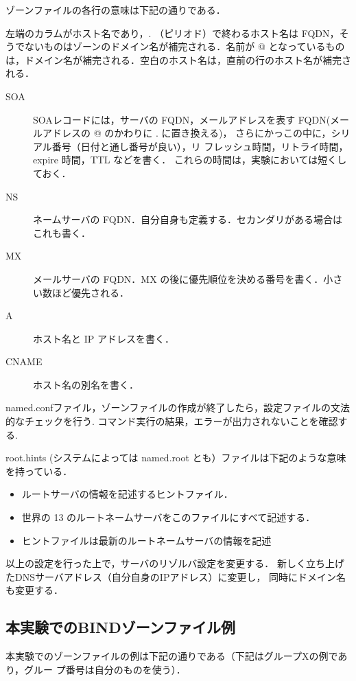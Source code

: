 ゾーンファイルの各行の意味は下記の通りである．

左端のカラムがホスト名であり，. （ピリオド）で終わるホスト名は FQDN，そ
うでないものはゾーンのドメイン名が補完される．名前が @ となっているもの
は，ドメイン名が補完される．空白のホスト名は，直前の行のホスト名が補完さ
れる．

\begin{description}
 \item[SOA] SOAレコードには，サーバの FQDN，メールアドレスを表す FQDN(メー
	    ルアドレスの @ のかわりに . に置き換える)，
	    さらにかっこの中に，シリアル番号（日付と通し番号が良い），リ
	    フレッシュ時間，リトライ時間，expire 時間，TTL などを書く．
	    これらの時間は，実験においては短くしておく．
 \item[NS] ネームサーバの FQDN．自分自身も定義する．セカンダリがある場合はこれも書く．
 \item[MX] メールサーバの FQDN．MX の後に優先順位を決める番号を書く．小さい数ほど優先される．
 \item[A] ホスト名と IP アドレスを書く．
 \item[CNAME] ホスト名の別名を書く．
\end{description}

named.confファイル，ゾーンファイルの作成が終了したら，設定ファイルの文法的なチェックを行う.
コマンド実行の結果，エラーが出力されないことを確認する.

root.hints (システムによっては named.root とも）ファイルは下記のような意味を持っている．
\begin{itemize}
\item ルートサーバの情報を記述するヒントファイル．
\item 世界の 13 のルートネームサーバをこのファイルにすべて記述する．
\item ヒントファイルは最新のルートネームサーバの情報を記述
\end{itemize}

以上の設定を行った上で，サーバのリゾルバ設定を変更する．
新しく立ち上げたDNSサーバアドレス（自分自身のIPアドレス）に変更し，
同時にドメイン名も変更する．

\subsection{本実験でのBINDゾーンファイル例}

本実験でのゾーンファイルの例は下記の通りである（下記はグループXの例であり，グルー
プ番号は自分のものを使う）．

